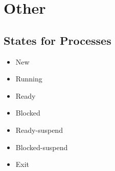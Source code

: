 \chapter{Other} %
\label{cha:other}
    \section{States for Processes} %
    \label{sec:states_for_processes}
    \begin{itemize}
        \item New
        \item Running
        \item Ready
        \item Blocked
        \item Ready-suspend
        \item Blocked-suspend
        \item Exit
    \end{itemize}


